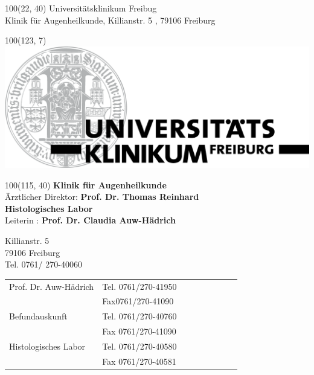 \documentclass[12pt]{g-brief}
\begin{document}
\baselineskip10pt

\textblockorigin{0in}{0in}
\setlength{\TPHorizModule}{1mm}
\setlength{\TPVertModule}{1mm}

{

\begin{textblock}{100}(22, 40) 
\noindent 
\scriptsize
Universitätsklinikum Freibug\\
\scriptsize
Klinik für Augenheilkunde, Killianstr. 5 , 79106 Freiburg
\end{textblock}
}


{
\begin{textblock}{100}(123, 7) 
\includegraphics[scale=0.25]{Formuladr.png}
\end{textblock}
}


{

\begin{textblock}{100}(115, 40) 
\normalsize
\textbf{Klinik für Augenheilkunde} \\
\footnotesize
Ärztlicher Direktor: \textbf{Prof. Dr. Thomas Reinhard}\\


\textbf{Histologisches Labor}\\
Leiterin : \textbf{Prof. Dr. Claudia Auw-Hädrich}

\footnotesize
Killianstr. 5\\
79106 Freiburg\\
Tel. 0761/ 270-40060\\

\begin{tabular}{@{}p{0.4\linewidth}p{0.6\linewidth}}
Prof. Dr. Auw-Hädrich & Tel. 0761/270-41950 \\
 & Fax0761/270-41090\\[1.5mm]
 
 Befundauskunft & Tel. 0761/270-40760 \\
 & Fax 0761/270-41090\\[1.5mm]
 
  Histologisches Labor & Tel. 0761/270-40580 \\
 &Fax 0761/270-40581
 \end{tabular}
\end{textblock}
}



\begin{g-brief}
 \end{g-brief}
\end{document}
